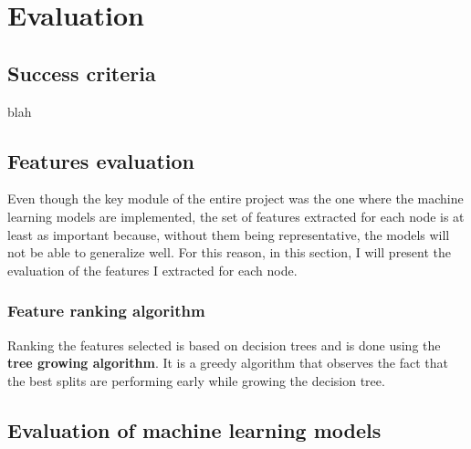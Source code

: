 
	\chapter{Evaluation}
	\section{Success criteria} \label{Section: eval/success-criteria}
		blah
	\section{Features evaluation} \label{Section: eval/features}
		Even though the key module of the entire project was the one where the machine learning models are implemented, the set of features extracted for each node is at least as important because, without them being representative, the models will not be able to generalize well. For this reason, in this section, I will present the evaluation of the features I extracted for each node.
		
		\subsection{Feature ranking algorithm}
		Ranking the features selected is based on decision trees and is done using the \textbf{tree growing algorithm}. It is a greedy algorithm that observes the fact that the best splits are performing early while growing the decision tree. 
		
	\section{Evaluation of machine learning models} \label{Section: eval/ml}
